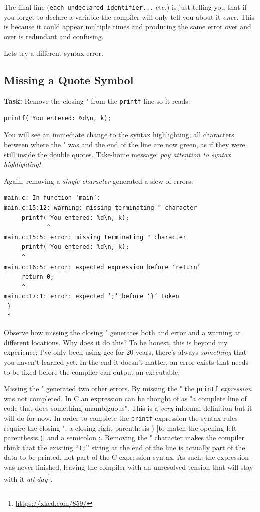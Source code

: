 \documentclass{lab}
\begin{document}
The final line (\texttt{each undeclared identifier...} etc.) is just telling you that if you forget to declare a variable the compiler will only tell you about it \textit{once}. This is because it could appear multiple times and producing the same error over and over is redundant and confusing.

Lets try a different syntax error.

\subsection{Missing a Quote Symbol}

\textbf{Task:} Remove the closing " from the \texttt{printf} line so it reads:

\begin{lstlisting}[style=CStyle]
printf("You entered: %d\n, k);
\end{lstlisting}

You will see an immediate change to the syntax highlighting; all characters between where the " was and the end of the line are now green, as if they were still inside the double quotes. Take-home message: \textit{pay attention to syntax highlighting!}

Again, removing a \textit{single character} generated a slew of errors:

\begin{lstlisting}[basicstyle=\ttfamily]
main.c: In function ‘main’:
main.c:15:12: warning: missing terminating " character
     printf("You entered: %d\n, k);
            ^
main.c:15:5: error: missing terminating " character
     printf("You entered: %d\n, k);
     ^
main.c:16:5: error: expected expression before ‘return’
     return 0;
     ^
main.c:17:1: error: expected ‘;’ before ‘}’ token
 }
 ^
\end{lstlisting}

Observe how missing the closing " generates both and error and a warning at different locations. Why does it do this? To be honest, this is beyond my experience; I've only been using gcc for 20 years, there's always \textit{something} that you haven't learned yet. In the end it doesn't matter, an error exists that needs to be fixed before the compiler can output an executable.

Missing the " generated two other errors. By missing the " the \texttt{printf} \textit{expression} was not completed. In C an expression can be thought of as "a complete line of code that does something unambiguous". This is a \textit{very} informal definition but it will do for now. In order to complete the \texttt{printf} expression the syntax rules require the closing ", a closing right parenthesis ) [to match the opening left parenthesis (] and a semicolon ;. Removing the " character makes the compiler think that the existing ``\texttt{);}'' string at the end of the line is actually part of the data to be printed, not part of the C expression syntax. As such, the expression was never finished, leaving the compiler with an unresolved tension that will stay with it \textit{all day}\footnote{\url{https://xkcd.com/859/}}.
\end{document}
